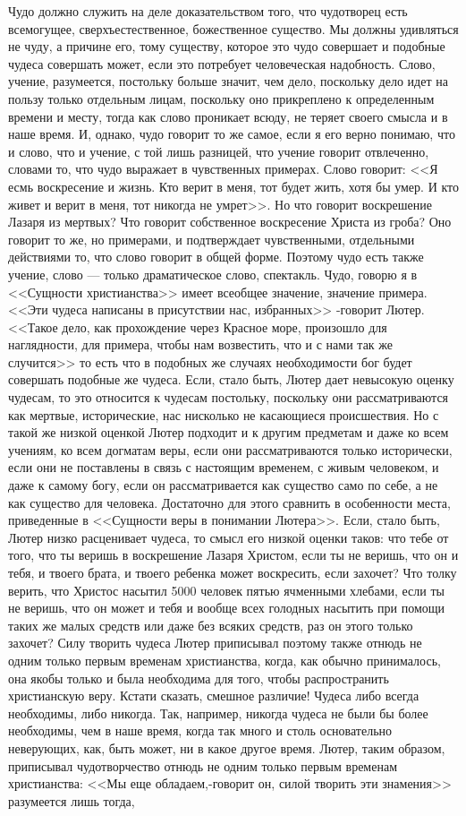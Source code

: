 \documentclass[12pt]{article}
\begin{document}
Чудо должно служить на деле доказательством того, что чудотворец есть всемогущее, сверхъестественное, божественное существо. Мы должны удивляться не чуду, а причине его, тому существу, которое это чудо совершает и подобные чудеса совершать может, если это потребует человеческая надобность. Слово, учение, разумеется, постольку больше значит, чем дело, поскольку дело идет на пользу только отдельным лицам, поскольку оно прикреплено к определенным времени и месту, тогда как слово проникает всюду, не теряет своего смысла и в наше время. И, однако, чудо говорит то же самое, если я его верно понимаю, что и слово, что и учение, с той лишь разницей, что учение говорит отвлеченно, словами то, что чудо выражает в чувственных примерах. Слово говорит: <<Я есмь воскресение и жизнь. Кто верит в меня, тот будет жить, хотя бы умер. И кто живет и верит в меня, тот никогда не умрет>>. Но что говорит воскрешение Лазаря из мертвых? Что говорит собственное воскресение Христа из гроба? Оно говорит то же, но примерами, и подтверждает чувственными, отдельными действиями то, что слово говорит в общей форме. Поэтому чудо есть также учение, слово --- только драматическое слово, спектакль. Чудо, говорю я в <<Сущности христианства>>  имеет всеобщее значение, значение примера. <<Эти чудеса написаны в присутствии нас, избранных>>  -говорит Лютер. <<Такое дело, как прохождение через Красное море, произошло для наглядности, для примера, чтобы нам возвестить, что и с нами так же случится>>  то есть что в подобных же случаях необходимости бог будет совершать подобные же чудеса. Если, стало быть, Лютер дает невысокую оценку чудесам, то это относится к чудесам постольку, поскольку они рассматриваются как мертвые, исторические, нас нисколько не касающиеся происшествия. Но с такой же низкой оценкой Лютер подходит и к другим предметам и даже ко всем учениям, ко всем догматам веры, если они рассматриваются только исторически, если они не поставлены в связь с настоящим временем, с живым человеком, и даже к самому богу, если он рассматривается как существо само по себе, а не как существо для человека. Достаточно для этого сравнить в особенности места, приведенные в <<Сущности веры в понимании Лютера>>. Если, стало быть, Лютер низко расценивает чудеса, то смысл его низкой оценки таков: что тебе от того, что ты веришь в воскрешение Лазаря Христом, если ты не веришь, что он и тебя, и твоего брата, и твоего ребенка может воскресить, если захочет? Что толку верить, что Христос насытил 5000 человек пятью ячменными хлебами, если ты не веришь, что он может и тебя и вообще всех голодных насытить при помощи таких же малых средств или даже без всяких средств, раз он этого только захочет? Силу творить чудеса Лютер приписывал поэтому также отнюдь не одним только первым временам христианства, когда, как обычно принималось, она якобы только и была необходима для того, чтобы распространить христианскую веру. Кстати сказать, смешное различие! Чудеса либо всегда необходимы, либо никогда. Так, например, никогда чудеса не были бы более необходимы, чем в наше время, когда так много и столь основательно неверующих, как, быть может, ни в какое другое время. Лютер, таким образом, приписывал чудотворчество отнюдь не одним только первым временам христианства: <<Мы еще обладаем,-говорит он, силой творить эти знамения>>  разумеется лишь тогда, 
\end{document}
